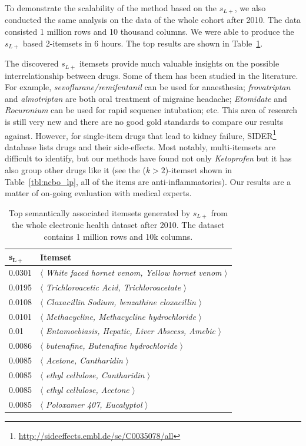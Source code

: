 To demonstrate the scalability of the method based on the $s_{L+}$, we also conducted the same analysis on the data of the whole cohort after 2010. The data consisted 1 million rows and 10 thousand columns. We were able to produce the $s_{L+}$ based 2-itemsets in 6 hours. The top results are shown in Table~\ref{tbl:ncbo_lp_whole}.

The discovered $s_{L+}$ itemsets provide much valuable insights on the possible interrelationship between drugs. Some of them has been studied in the literature. For example, \emph{sevoflurane/remifentanil} can be used for anaesthesia; \emph{frovatriptan} and \emph{almotriptan} are both oral treatment of migraine headache; \emph{Etomidate} and \emph{Rocuronium} can be used for rapid sequence intubation; etc. This area of research is still very new and there are no good gold standards to compare our results against.  However, for single-item drugs that lead to kidney failure, SIDER\footnote{\url{http://sideeffects.embl.de/se/C0035078/all}} database lists drugs and their side-effects.  Most notably, multi-itemsets are difficult to identify, but our methods have found not only \emph{Ketoprofen} but it has also group other drugs like it (see the ($k>2$)-itemset shown in Table~\ref{tbl:ncbo_lp}, all of the items are anti-inflammatories). Our results are a matter of on-going evaluation with medical experts.


\begin{table}
\begin{center}
\begin{tabular}{l | l }
  \hline
$\mathbf{s_{L+}}$      &   \textbf{Itemset}\\
  \hline\hline
0.0301	&$\langle$\emph{	White faced hornet venom, Yellow hornet venom		}$\rangle$\\
0.0195	&$\langle$\emph{	Trichloroacetic Acid, Trichloroacetate		}$\rangle$\\
0.0108	&$\langle$\emph{	Cloxacillin Sodium, benzathine cloxacillin		}$\rangle$\\
0.0101	&$\langle$\emph{	Methacycline, Methacycline hydrochloride		}$\rangle$\\
0.01	&$\langle$\emph{	Entamoebiasis, Hepatic, Liver Abscess, Amebic		}$\rangle$\\
0.0086	&$\langle$\emph{	butenafine, Butenafine hydrochloride		}$\rangle$\\
0.0085	&$\langle$\emph{	Acetone, Cantharidin		}$\rangle$\\
0.0085	&$\langle$\emph{	ethyl cellulose, Cantharidin		}$\rangle$\\
0.0085	&$\langle$\emph{	ethyl cellulose, Acetone		}$\rangle$\\
0.0085	&$\langle$\emph{	Poloxamer 407, Eucalyptol		}$\rangle$\\
  \hline
\end{tabular}
\end{center}
\caption[Top $s_{L+}$ results on the whole electronic health dataset.]{\label{tbl:ncbo_lp_whole} Top semantically associated itemsets generated by $s_{L+}$ from the whole electronic health dataset after 2010. The dataset contains 1 million rows and 10k columns.}
\end{table}
